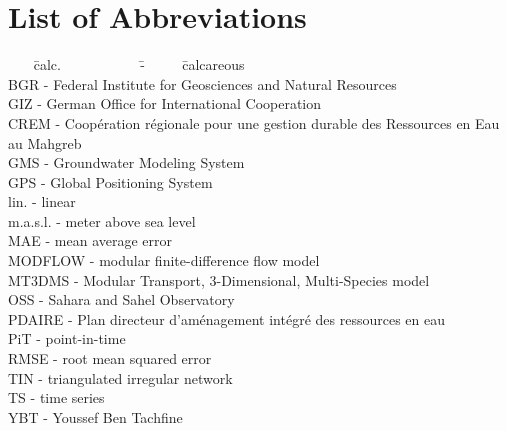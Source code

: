 \chapter*{List of Abbreviations}
\label{Chap-Abbreviations}

\begin{tabbing}

    ~~~ \= calc. ~~~~~~~~~~ \= - ~~~~ \= calcareous\\

    \> BGR \> - \> Federal Institute for Geosciences and Natural Resources\\

    \> GIZ \> - \> German Office for International Cooperation\\

    \> CREM \> - \> Coopération régionale pour une gestion durable des Ressources en Eau au Mahgreb\\

    \> GMS \> - \> Groundwater Modeling System\\

    \> GPS \> - \> Global Positioning System\\

    \> lin. \> - \> linear\\

    \> m.a.s.l. \> - \> meter above sea level\\

    \> MAE \> - \> mean average error\\

    \> MODFLOW \> - \>  modular finite-difference
    flow model\\

    \> MT3DMS \> - \> Modular Transport, 3-Dimensional, Multi-Species   model\\

    \> OSS \> - \> Sahara and Sahel Observatory\\

    \> PDAIRE \> - \> Plan directeur d'aménagement intégré des ressources en eau\\

    \> PiT \> - \> point-in-time\\

    \> RMSE \> - \> root mean squared error\\

    \> TIN \> - \> triangulated irregular network\\

    \> TS \> - \> time series\\

    \> YBT \> - \> Youssef Ben Tachfine\\

\end{tabbing}